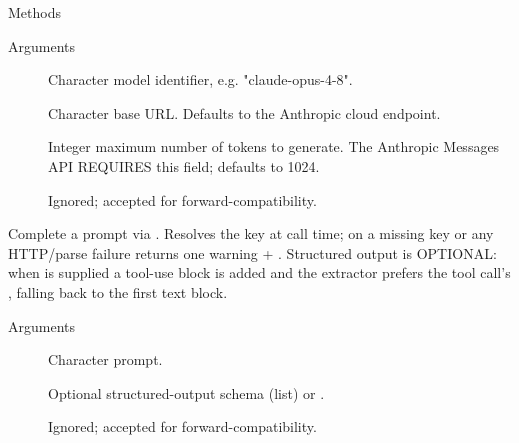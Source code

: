 \documentclass[a4paper]{book}
\begin{document}
\begin{Section}{Methods}
\begin{SubSection}{}
\begin{SubSubSection}{Arguments}
\begin{description}
\item[] Character model identifier, e.g. "claude-opus-4-8".
\item[] Character base URL. Defaults to the Anthropic cloud
endpoint.
\item[] Integer maximum number of tokens to generate. The
Anthropic Messages API REQUIRES this field; defaults to 1024.
\item[] Ignored; accepted for forward-compatibility.

\end{description}



\end{SubSubSection}

\end{SubSection}




\hypertarget{method-AnthropicProvider-complete}{}
%
\begin{SubSection}{}
Complete a prompt via .
Resolves the key at call time; on a missing key or any HTTP/parse failure
returns one warning + . Structured output is OPTIONAL: when
 is supplied a tool-use  block is added and
the extractor prefers the tool call's , falling back to the
first text block.
%

%
\begin{SubSubSection}{Arguments}

\begin{description}

\item[] Character prompt.
\item[] Optional structured-output schema (list) or .
\item[] Ignored; accepted for forward-compatibility.

\end{description}




\end{SubSubSection}
\end{SubSection}
\end{Section}
\end{document}
